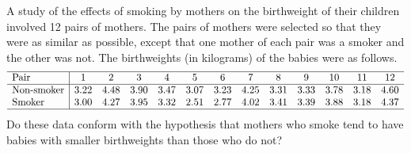 
\begin{example}
A study of the effects of smoking by mothers on the birthweight of their children involved 12 pairs of mothers. The pairs of mothers were selected so that they were as similar as possible, except that one mother of each pair was a smoker and the other was not. The birthweights (in kilograms) of the babies were as follows.
\small
\[\begin{array}{l|cccccccccccc} \hline
\text{Pair}			& 1      &  2     & 3      & 4      & 5      & 6      & 7      & 8      & 9      & 10     & 11     & 12 		\\ \hline
\text{Non-smoker}	& 3.22   & 4.48   & 3.90   & 3.47   & 3.07   & 3.23   & 4.25   & 3.31   & 3.33   & 3.78   & 3.18   & 4.60  	\\ 
\text{Smoker}		& 3.00   & 4.27   & 3.95   & 3.32   & 2.51   & 2.77   & 4.02   & 3.41   & 3.39   & 3.88   & 3.18   & 4.37 	\\ \hline
\end{array}\]
\normalsize
Do these data conform with the hypothesis that mothers who smoke tend to have babies with smaller birthweights than those who do not? 
\end{example}

